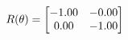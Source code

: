 \documentclass[preview]{standalone}
\begin{document}
\begin{align*}
\special{dvisvgm:raw <g id='unique000'>}R(\theta) = \begin{bmatrix}-1.00 & -0.00\\0.00 & -1.00\end{bmatrix}\special{dvisvgm:raw </g>}
\end{align*}
\end{document}
